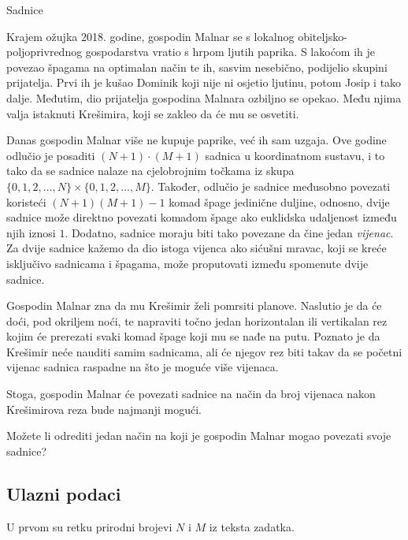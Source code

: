 \begin{statement}[
  problempoints=100,
  timelimit=1 sekunda,
  memorylimit=512 MiB,
]{Sadnice}

Krajem ožujka 2018. godine, gospodin Malnar se s lokalnog
obiteljsko-poljoprivrednog gospodarstva vratio s hrpom ljutih paprika.
S lakoćom ih je povezao špagama na optimalan način te ih, sasvim nesebično,
podijelio skupini prijatelja. Prvi ih je kušao Dominik koji nije ni osjetio
ljutinu, potom Josip i tako dalje. Međutim, dio prijatelja gospodina Malnara
ozbiljno se opekao. Među njima valja istaknuti Krešimira, koji se zakleo da
će mu se osvetiti.

Danas gospodin Malnar više ne kupuje paprike, već ih sam uzgaja. Ove godine
odlučio je posaditi $(N+1) \cdot (M+1)$ sadnica u koordinatnom sustavu, i to
tako da se sadnice nalaze na cjelobrojnim točkama iz skupa $\{0,1,2,\dots,N\}
\times \{0,1,2,\dots,M\}$. Također, odlučio je sadnice međusobno povezati
koristeći $(N+1)(M+1)-1$ komad špage jedinične duljine, odnosno, dvije
sadnice može direktno povezati komadom špage ako euklidska udaljenost između
njih iznosi $1$. Dodatno, sadnice moraju biti tako povezane da čine jedan
\textit{vijenac}. Za dvije sadnice kažemo da dio istoga vijenca ako sićušni
mravac, koji se kreće isključivo sadnicama i špagama, može proputovati između
spomenute dvije sadnice.

Gospodin Malnar zna da mu Krešimir želi pomrsiti planove. Naslutio je da će
doći, pod okriljem noći, te napraviti točno jedan horizontalan ili
vertikalan rez kojim će prerezati svaki komad špage koji mu se nađe na putu.
Poznato je da Krešimir neće nauditi samim sadnicama, ali će njegov rez biti
takav da se početni vijenac sadnica raspadne na što je moguće više vijenaca.

Stoga, gospodin Malnar će povezati sadnice na način da broj vijenaca nakon
Krešimirova reza bude najmanji mogući.

Možete li odrediti jedan način na koji je gospodin Malnar mogao povezati
svoje sadnice?

\subsection*{Ulazni podaci}
U prvom su retku prirodni brojevi $N$ i $M$ iz teksta zadatka.


\end{statement}
